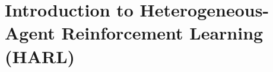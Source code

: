 \begin{comment}
    3.3 Applications of MARL
	•	Autonomous Driving: Coordinated control of multiple autonomous vehicles to improve traffic flow and safety.
	•	Robotics: Multi-robot systems for tasks such as search and rescue, where robots must collaborate to achieve a common objective.
	•	Economics and Finance: Modeling and simulation of market dynamics involving multiple agents with competing interests.
	•	Healthcare: Optimizing the allocation of resources and coordination of treatments across multiple healthcare providers.
	•	Key Paper: Yang, Y. et al. (2023). Efficient policy learning in large-scale heterogeneous-agent environments.
    3.2 Advances in MARL
    The advancement of MARL includes the development of algorithms that allow agents to learn in environments with other learning agents, leading to applications in fields such as robotics, game theory, and economics.
        •	Key Paper: Busoniu, L., Babuska, R., & De Schutter, B. (2008). A comprehensive survey of multi-agent reinforcement learning.
        •	Key Paper: Mnih, V. et al. (2015). Human-level control through deep reinforcement learning.
        •	Key Paper: Silver, D. et al. (2017). Mastering the game of Go without human knowledge.
\end{comment}


\section{Introduction to Heterogeneous-Agent Reinforcement Learning (HARL)}





